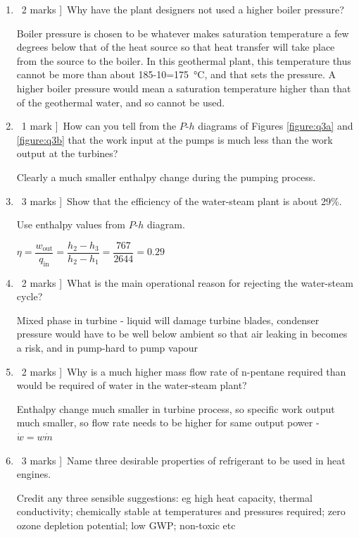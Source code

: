 \documentclass[a4paper,12pt,fleqn]{article}
\begin{document}
\begin{enumerate}[label=\alph*)]
\item \lbrack\ 2 marks ]\ Why have the plant designers not used a higher boiler pressure?\par
Boiler pressure is chosen to be whatever makes saturation temperature a few degrees below that of the heat source so that heat transfer will take place from the source to the boiler. In this geothermal plant, this temperature thus cannot be more than about 185-10=\SI{175}{\celsius}, and that sets the pressure. A higher boiler pressure would mean a saturation temperature higher than that of the geothermal water, and so cannot be used.
\item \lbrack\ 1 mark ]\ How can you tell from the $P$-$h$ diagrams of Figures \ref{figure:q3a} and \ref{figure:q3b} that the work input at the pumps is much less than the work output at the turbines?\par
Clearly a much smaller enthalpy change during the pumping  process.
\item \lbrack\ 3 marks ]\ Show that the efficiency of the water-steam plant is about 29\%.\par
Use enthalpy values from $P$-$h$ diagram.\par
$\eta=\dfrac{w_\mathrm{out}}{q_\mathrm{in}}=\dfrac{h_2-h_3}{h_2-h_1}=\dfrac{767}{2644}=0.29$
\item \lbrack\ 2 marks ]\ What is the main operational reason for rejecting the water-steam cycle?\par
Mixed phase in turbine - liquid will damage turbine blades, condenser pressure would have to be well below ambient so that air leaking in becomes a risk, and in pump-hard to pump vapour
\item \lbrack\ 2 marks ]\ Why is a much higher mass flow rate of n-pentane required than would be required of water in the water-steam plant?\par
Enthalpy change much smaller in turbine process, so specific work output much smaller, so flow rate needs to be higher for same output power - $\dot w=w\dot m$
\item \lbrack\ 3 marks ]\  Name three desirable properties of refrigerant to be used in heat engines.\par
Credit any three sensible suggestions: eg high heat capacity, thermal conductivity; chemically stable at temperatures and pressures required; zero ozone depletion potential; low GWP; non-toxic etc
\end{enumerate}
\end{document}
